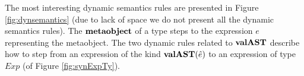 The most interesting dynamic semantics rules are presented in Figure \ref{fig:dynsemantics} (due to lack of space we do not present all the dynamic semantics rules). The $\textbf{metaobject}$ of a type steps to the expression $e$ representing the metaobject. The two dynamic rules related to $\textbf{valAST}$ describe how to step from an expression of the kind $\textbf{valAST}(\hat{e})$ to an expression of type $Exp$ (of Figure \ref{fig:synExpTy}).


